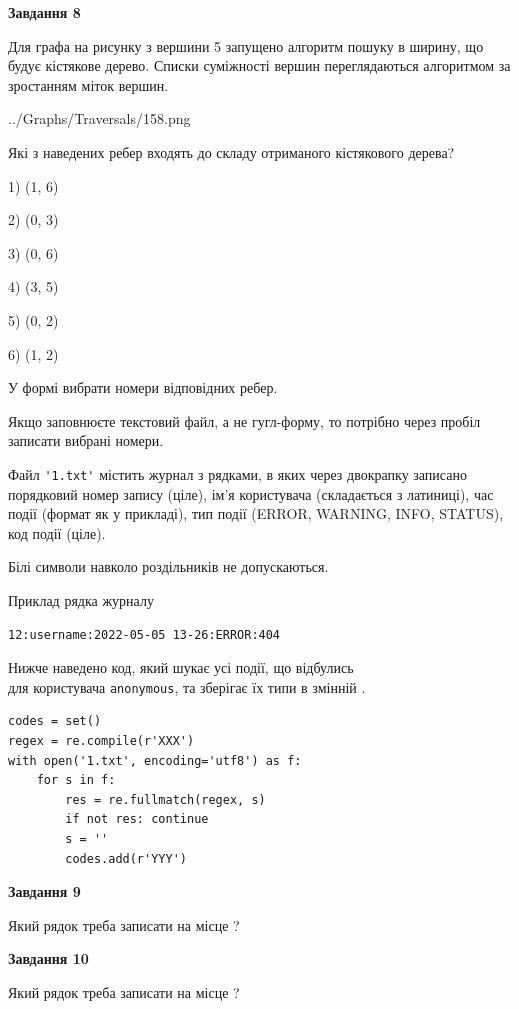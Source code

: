 \documentclass[12pt, ukrainian]{article}
\def\code#1{\Verb!#1!}
\begin{document}
{\begin {large}
{\begin {center}\textbf{Завдання 8}\end {center}}\par
Для графа на рисунку з вершини 5 запущено алгоритм пошуку в ширину, що будує кістякове дерево. Списки суміжності вершин переглядаються алгоритмом за зростанням міток вершин.\par
\begin{center}
	{../Graphs/Traversals/158.png}
\end{center}
\par Які з наведених ребер входять до складу отриманого кістякового дерева?\par
1) (1, 6)\par
2) (0, 3)\par
3) (0, 6)\par
4) (3, 5)\par
5) (0, 2)\par
6) (1, 2)\par
{\vskip 15pt} У формі вибрати номери відповідних ребер.


Якщо заповнюєте текстовий файл, а не гугл-форму, то потрібно через пробіл записа\-ти вибрані номери.\par
\newpage


Файл \code{'1.txt'} містить журнал з рядками, в яких через двокрапку записано поряд\-ко\-вий номер запису (ціле), ім'я користувача (складається з латиниці), час події (фор\-мат як у прикладі), тип події (ERROR, WARNING, INFO, STATUS), код події (ціле).

Білі символи навколо роздільників не допускаються.

Приклад рядка журналу



\begin{verbatim}
12:username:2022-05-05 13-26:ERROR:404
\end{verbatim}


Нижче наведено код, який шукає усі події, що відбулись\\ для користувача \code{anonymous}, та зберігає їх типи в змінній .



\begin{verbatim}
codes = set()
regex = re.compile(r'XXX')
with open('1.txt', encoding='utf8') as f:
    for s in f:
        res = re.fullmatch(regex, s)
        if not res: continue
        s = ''
        codes.add(r'YYY')
\end{verbatim}


{\begin {center}\textbf{Завдання 9}\end {center}}\par
Який рядок треба записати на місце  ?\par
\vspace{5mm}


{\begin {center}\textbf{Завдання 10}\end {center}}\par
Який рядок треба записати на місце  ?\par


\newpage


\end {large}}
\end{document}
